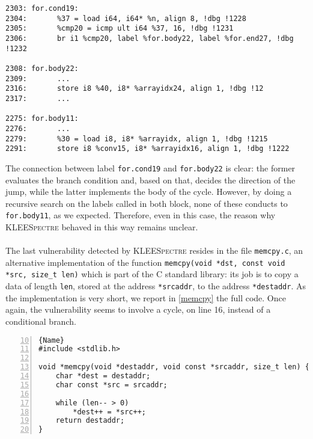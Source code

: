 \documentclass[target=mst,aauheader=aics]{thud}
\theoremstyle{definition}
\begin{document}
	\lstset{
		numbers=none
	}
	\begin{lstlisting}[caption=\texttt{assembly.ll}]
2303: for.cond19:                
2304: 		%37 = load i64, i64* %n, align 8, !dbg !1228
2305:		%cmp20 = icmp ult i64 %37, 16, !dbg !1231                       
2306: 		br i1 %cmp20, label %for.body22, label %for.end27, !dbg !1232

2308: for.body22: 
2309:		...
2316:		store i8 %40, i8* %arrayidx24, align 1, !dbg !12
2317:		...

2275: for.body11: 
2276:		...
2279: 		%30 = load i8, i8* %arrayidx, align 1, !dbg !1215
2291: 		store i8 %conv15, i8* %arrayidx16, align 1, !dbg !1222
	\end{lstlisting}
	\vspace{3mm}
	
	The connection between label \texttt{for.cond19} and \texttt{for.body22} is clear: the former evaluates the branch condition and, based on that, decides the direction of the jump, while the latter implements the body of the cycle. However, by doing a recursive search on the labels called in both block, none of these conducts to \texttt{for.body11}, as we expected. Therefore, even in this case, the reason why \textsc{KLEESpectre} behaved in this way remains unclear.
	\paragraph{}The last vulnerability detected by \textsc{KLEESpectre} resides in the file \texttt{memcpy.c}, an alternative implementation of the function \texttt{memcpy(void *dst, const void *src, size\_t len)} which is part of the C standard library: its job is to copy a data of length \texttt{len}, stored at the address \texttt{*srcaddr}, to the address \texttt{*destaddr}. As the implementation is very short, we report in \ref{memcpy} the full code. Once again, the vulnerability seems to involve a cycle, on line 16, instead of a conditional branch.
	
	\begin{minipage}{.9\textwidth}
	\begin{lstlisting}[caption=\texttt{memcpy.c}, firstnumber=10, label=memcpy,numbers=left]{Name}
#include <stdlib.h>

void *memcpy(void *destaddr, void const *srcaddr, size_t len) {
	char *dest = destaddr;
	char const *src = srcaddr;
	
	while (len-- > 0)
		*dest++ = *src++;
	return destaddr;
}
	\end{lstlisting}
	\end{minipage}	
	\vspace{3mm}
		
\end{document}
